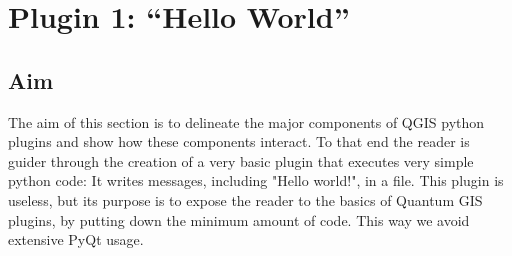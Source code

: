 \section{Plugin 1: ``Hello World''}
\label{sect:plugin_1}
\subsection{Aim}
\label{ssect:plugin_1_aim}
\par %
The aim of this section is to delineate the major components of QGIS python plugins and show how these components interact. To that end the reader is guider through the creation of a very basic plugin that executes very simple python code: It writes messages, including "Hello world!", in a file. This plugin is useless, but its purpose is to expose the reader to the basics of Quantum GIS plugins, by putting down the minimum amount of code. This way we avoid extensive PyQt usage.
